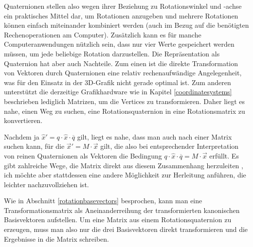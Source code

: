 Quaternionen stellen also wegen ihrer Beziehung zu Rotationswinkel und -achse ein praktisches Mittel dar, um Rotationen anzugeben und mehrere Rotationen können einfach miteinander kombiniert werden (auch im Bezug auf die benötigten Rechenoperationen am Computer). Zusätzlich kann es für manche Computeranwendungen nützlich sein, dass nur vier Werte gespeichert werden müssen, um jede beliebige Rotation darzustellen. Die Repräsentation als Quaternion hat aber auch Nachteile. Zum einen ist die direkte Transformation von Vektoren durch Quaternionen eine relativ rechenaufwändige Angelegenheit, was für den Einsatz in der 3D-Grafik nicht gerade optimal ist. Zum anderen unterstützt die derzeitige Grafikhardware wie in Kapitel \ref{coordinatesystems} beschrieben lediglich Matrizen, um die Vertices zu transformieren. Daher liegt es nahe, einen Weg zu suchen, eine Rotationsquaternion in eine Rotationsmatrix zu konvertieren. 

Nachdem ja $\hat{x}'= q \cdot \hat{x} \cdot \overline{q}$ gilt, liegt es nahe, dass man auch nach einer Matrix suchen kann, für die $\vec{x}' = M \cdot \vec{x}$ gilt, die also bei entsprechender Interpretation von reinen Quaternionen als Vektoren die Bedingung $q \cdot \hat{x} \cdot \overline{q} = M \cdot \vec{x}$ erfüllt. Es gibt zahlreiche Wege, die Matrix direkt aus diesem Zusammenhang herzuleiten , ich möchte aber stattdessen eine andere Möglichkeit zur Herleitung anführen, die leichter nachzuvollziehen ist.

Wie in Abschnitt \ref{rotationbasevectors} besprochen, kann man eine Transformationsmatrix als Aneinanderreihung der transformierten kanonischen Basisvektoren aufstellen. Um eine Matrix aus einem Rotationsquaternion zu erzeugen, muss man also nur die drei Basisvektoren direkt transformieren und die Ergebnisse in die Matrix schreiben.

